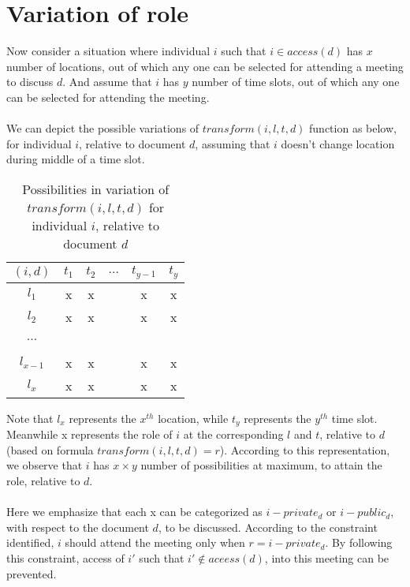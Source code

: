 \documentclass{article}
\begin{document}
\section{Variation of role}
\noindent
Now consider a situation where individual $i$ such that $i \in access(d)$ has $x$ number of locations, out of which any one can be selected for attending a meeting to discuss $d$. And assume that $i$ has $y$ number of time slots, out of which any one can be selected for attending the meeting.\\ \\
We can depict the possible variations of $transform(i, l, t, d)$ function as below, for individual $i$, relative to document $d$, assuming that $i$ doesn't change location during middle of a time slot.
\begin{table}[H]
    \centering
    \begin{tabular}{|c|c|c|c|c|c|}
    \hline
    $(i, d)$ & $t_1$ & $t_2$ & $...$ & $t_{y-1}$ & $t_{y}$ \\
    \hline
    $l_1$ & x & x & \  & x & x \\
    \hline
    $l_2$ & x & x & \  & x & x \\
    \hline
    $...$ & \  & \  & \  & \  & \  \\
    \hline
    $l_{x-1}$ & x & x & \  & x & x \\
    \hline
    $l_{x}$ & x & x & \  & x & x \\
    \hline
    \end{tabular}
    \caption{Possibilities in variation of $transform(i,l,t,d)$ for individual $i$, relative to document $d$}
    \label{tab:six_columns_six_rows}
\end{table}

\noindent
Note that $l_x$ represents the $x^{th}$ location, while $t_y$ represents the $y^{th}$ time slot. Meanwhile x represents the role of $i$ at the corresponding $l$ and $t$, relative to $d$ (based on formula $transform(i, l, t, d) = r$). According to this representation, we observe that $i$ has $x \times y$ number of possibilities at maximum, to attain the role, relative to $d$.\\ \\
Here we emphasize that each x can be categorized as $i-private_d$ or $i-public_d$, with respect to the document $d$, to be discussed. According to the constraint identified, $i$ should attend the meeting only when $r = i-private_{d}$. By following this constraint, access of $i'$ such that $i' \notin aceess(d)$, into this meeting can be prevented.\\ \\ 
\end{document}
